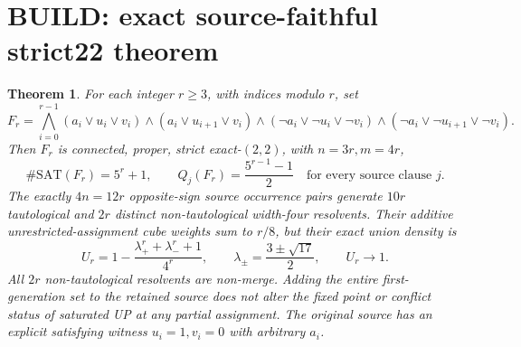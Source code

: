 \documentclass[10pt]{article}
\newtheorem{theorem}{Theorem}
\begin{document}
\section{BUILD: exact source-faithful strict22 theorem}
\begin{theorem}\label{th:strict}
For each integer $r\ge3$, with indices modulo $r$, set
\[
F_r=\bigwedge_{i=0}^{r-1}
(a_i\vee u_i\vee v_i)\land(a_i\vee u_{i+1}\vee v_i)
\land(\neg a_i\vee\neg u_i\vee\neg v_i)
\land(\neg a_i\vee\neg u_{i+1}\vee\neg v_i).
\]
Then $F_r$ is connected, proper, strict exact-$(2,2)$, with $n=3r,m=4r$,
\[
\#\mathrm{SAT}(F_r)=5^r+1,\qquad
Q_j(F_r)=\frac{5^{r-1}-1}{2}\quad\text{for every source clause }j.
\]
The exactly $4n=12r$ opposite-sign source occurrence pairs generate $10r$ tautological and $2r$ distinct non-tautological width-four resolvents. Their additive unrestricted-assignment cube weights sum to $r/8$, but their exact union density is
\[
U_r=1-\frac{\lambda_+^r+\lambda_-^r+1}{4^r},
\qquad
\lambda_\pm=\frac{3\pm\sqrt{17}}2,\qquad
U_r\longrightarrow1.
\]
All $2r$ non-tautological resolvents are non-merge. Adding the entire first-generation set to the retained source does not alter the fixed point or conflict status of saturated UP at any partial assignment. The original source has an explicit satisfying witness $u_i=1,v_i=0$ with arbitrary $a_i$.
\end{theorem}
\end{document}
